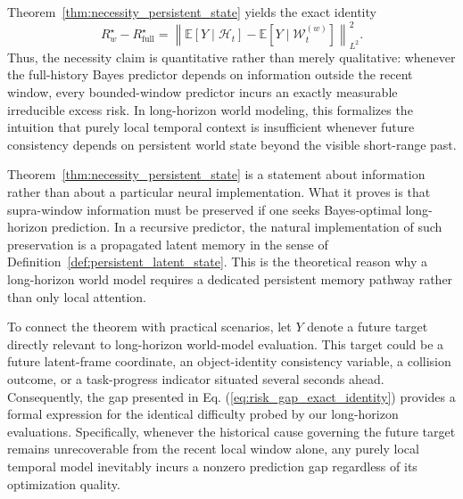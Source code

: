 \documentclass{llmxive}
\providecommand{\E}{\mathbb{E}}
\providecommand{\cH}{\mathcal{H}}
\providecommand{\cW}{\mathcal{W}}
\providecommand{\norm}[1]{\left\lVert #1 \right\rVert}
\begin{document}
\begin{remark}
\label{rem:information_theoretic_meaning}
Theorem~\ref{thm:necessity_persistent_state} yields the exact identity
\begin{equation}
R_w^\star - R_{\mathrm{full}}^\star
=
\norm{
\E[Y\mid \cH_t] - \E[Y\mid \cW_t^{(w)}]
}_{L^2}^2.
\label{eq:information_theoretic_identity}
\end{equation}
Thus, the necessity claim is quantitative rather than merely qualitative: whenever the full-history Bayes predictor depends on information outside the recent window, every bounded-window predictor incurs an exactly measurable irreducible excess risk. In long-horizon world modeling, this formalizes the intuition that purely local temporal context is insufficient whenever future consistency depends on persistent world state beyond the visible short-range past.
\end{remark}

\begin{remark}
\label{rem:architectural_interpretation}
Theorem~\ref{thm:necessity_persistent_state} is a statement about information rather than about a particular neural implementation. What it proves is that supra-window information must be preserved if one seeks Bayes-optimal long-horizon prediction. In a recursive predictor, the natural implementation of such preservation is a propagated latent memory in the sense of Definition~\ref{def:persistent_latent_state}. This is the theoretical reason why a long-horizon world model requires a dedicated persistent memory pathway rather than only local attention.
\end{remark}

\begin{remark}
\label{rem:connection_to_experiments}
To connect the theorem with practical scenarios, let $Y$ denote a future target directly relevant to long-horizon world-model evaluation. This target could be a future latent-frame coordinate, an object-identity consistency variable, a collision outcome, or a task-progress indicator situated several seconds ahead. Consequently, the gap presented in Eq. (\ref{eq:risk_gap_exact_identity}) provides a formal expression for the identical difficulty probed by our long-horizon evaluations. Specifically, whenever the historical cause governing the future target remains unrecoverable from the recent local window alone, any purely local temporal model inevitably incurs a nonzero prediction gap regardless of its optimization quality.
\end{remark}
\end{document}
